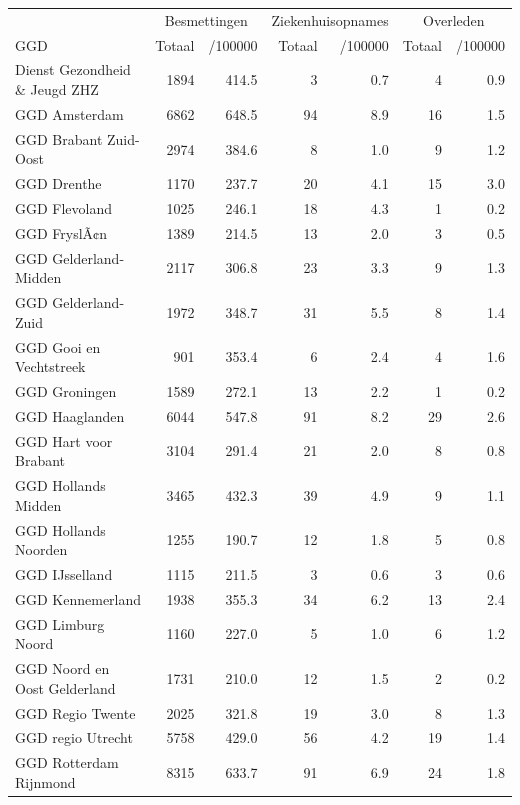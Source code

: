\documentclass[
  english,
  man,floatsintext]{apa6}
\begin{document}
\begin{table}[H]
\centering\begingroup\fontsize{10}{12}\selectfont

\begin{threeparttable}
\begin{tabular}{lrrrrrr}
\toprule
\multicolumn{1}{c}{ } & \multicolumn{2}{c}{Besmettingen} & \multicolumn{2}{c}{Ziekenhuisopnames} & \multicolumn{2}{c}{Overleden} \\
\cmidrule(l{3pt}r{3pt}){2-3} \cmidrule(l{3pt}r{3pt}){4-5} \cmidrule(l{3pt}r{3pt}){6-7}
GGD & Totaal & /100000 & Totaal & /100000 & Totaal & /100000\\
\midrule
Dienst Gezondheid \& Jeugd ZHZ & 1894 & 414.5 & 3 & 0.7 & 4 & 0.9\\
GGD Amsterdam & 6862 & 648.5 & 94 & 8.9 & 16 & 1.5\\
GGD Brabant Zuid-Oost & 2974 & 384.6 & 8 & 1.0 & 9 & 1.2\\
GGD Drenthe & 1170 & 237.7 & 20 & 4.1 & 15 & 3.0\\
GGD Flevoland & 1025 & 246.1 & 18 & 4.3 & 1 & 0.2\\
GGD FryslÃ¢n & 1389 & 214.5 & 13 & 2.0 & 3 & 0.5\\
GGD Gelderland-Midden & 2117 & 306.8 & 23 & 3.3 & 9 & 1.3\\
GGD Gelderland-Zuid & 1972 & 348.7 & 31 & 5.5 & 8 & 1.4\\
GGD Gooi en Vechtstreek & 901 & 353.4 & 6 & 2.4 & 4 & 1.6\\
GGD Groningen & 1589 & 272.1 & 13 & 2.2 & 1 & 0.2\\
GGD Haaglanden & 6044 & 547.8 & 91 & 8.2 & 29 & 2.6\\
GGD Hart voor Brabant & 3104 & 291.4 & 21 & 2.0 & 8 & 0.8\\
GGD Hollands Midden & 3465 & 432.3 & 39 & 4.9 & 9 & 1.1\\
GGD Hollands Noorden & 1255 & 190.7 & 12 & 1.8 & 5 & 0.8\\
GGD IJsselland & 1115 & 211.5 & 3 & 0.6 & 3 & 0.6\\
GGD Kennemerland & 1938 & 355.3 & 34 & 6.2 & 13 & 2.4\\
GGD Limburg Noord & 1160 & 227.0 & 5 & 1.0 & 6 & 1.2\\
GGD Noord en Oost Gelderland & 1731 & 210.0 & 12 & 1.5 & 2 & 0.2\\
GGD Regio Twente & 2025 & 321.8 & 19 & 3.0 & 8 & 1.3\\
GGD regio Utrecht & 5758 & 429.0 & 56 & 4.2 & 19 & 1.4\\
GGD Rotterdam Rijnmond & 8315 & 633.7 & 91 & 6.9 & 24 & 1.8\\

\end{tabular}
\end{threeparttable}
\end{table}
\end{document}
